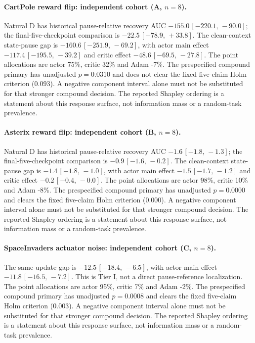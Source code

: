\documentclass[10pt]{article} %
\newcommand{\ci}[2]{\,[#1,\,#2]}
\begin{document}
\paragraph{CartPole reward flip: independent cohort (A, $n=8$).} Natural D has historical pause-relative recovery AUC $-155.0\ci{-220.1}{-90.0}$; the final-five-checkpoint comparison is $-22.5\ci{-78.9}{+33.8}$. The clean-context state-pause gap is $-160.6\ci{-251.9}{-69.2}$, with actor main effect $-117.4\ci{-195.5}{-39.2}$ and critic effect $-48.6\ci{-69.5}{-27.8}$. The point allocations are actor 75\%, critic 32\% and Adam -7\%. The prespecified compound primary has unadjusted $p=0.0310$ and does not clear the fixed five-claim Holm criterion ($0.093$). A negative component interval alone must not be substituted for that stronger compound decision. The reported Shapley ordering is a statement about this response surface, not information mass or a random-task prevalence.

\paragraph{Asterix reward flip: independent cohort (B, $n=8$).} Natural D has historical pause-relative recovery AUC $-1.6\ci{-1.8}{-1.3}$; the final-five-checkpoint comparison is $-0.9\ci{-1.6}{-0.2}$. The clean-context state-pause gap is $-1.4\ci{-1.8}{-1.0}$, with actor main effect $-1.5\ci{-1.7}{-1.2}$ and critic effect $-0.2\ci{-0.4}{-0.0}$. The point allocations are actor 98\%, critic 10\% and Adam -8\%. The prespecified compound primary has unadjusted $p=0.0000$ and clears the fixed five-claim Holm criterion ($0.000$). A negative component interval alone must not be substituted for that stronger compound decision. The reported Shapley ordering is a statement about this response surface, not information mass or a random-task prevalence.

\paragraph{SpaceInvaders actuator noise: independent cohort (C, $n=8$).} The same-update gap is $-12.5\ci{-18.4}{-6.5}$, with actor main effect $-11.8\ci{-16.5}{-7.2}$. This is Tier I, not a direct pause-reference localization. The point allocations are actor 95\%, critic 7\% and Adam -2\%. The prespecified compound primary has unadjusted $p=0.0008$ and clears the fixed five-claim Holm criterion ($0.003$). A negative component interval alone must not be substituted for that stronger compound decision. The reported Shapley ordering is a statement about this response surface, not information mass or a random-task prevalence.
\end{document}
